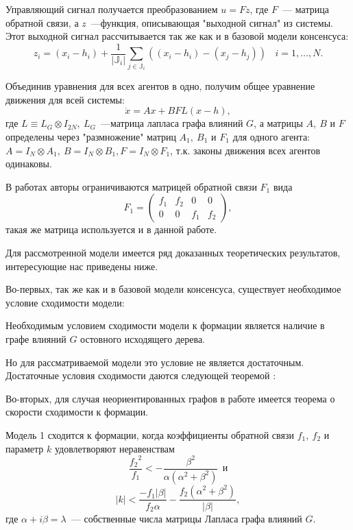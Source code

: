 Управляющий сигнал получается преобразованием $u=Fz$, где $F$~--- матрица обратной связи, а $z$~---функция, описывающая "выходной сигнал" из системы. Этот выходной сигнал рассчитывается так же как и в базовой модели консенсуса:
$$
z_i=(x_i-h_i)+\frac{1}{|\mathbb{J}_i|}\sum_{j\in\mathbb{J}_i}\left((x_i-h_i)-(x_j-h_j)\right)\ \ \ \ i=1,\ldots,N.
$$

Объединив уравнения для всех агентов в одно, получим общее уравнение движения для всей системы:
\begin{equation}
\dot{x}=Ax+BFL(x-h),
\label{eq:linear-motion}
\end{equation}
где $L\equiv L_G\otimes I_{2N},\ L_G$~---матрица лапласа графа влияний $G$, а матрицы $A,\ B$ и $F$ определены через "размножение" матриц $A_1,\ B_1$ и $F_1$ для одного агента: $A=I_N\otimes A_1,\ B=I_N\otimes B_1, F=I_N\otimes F_1$, т.к. законы движения всех агентов одинаковы.

В работах \cite{lafferriere2005decentralized, veerman2005flocks} авторы ограничиваются матрицей обратной связи $F_1$ вида 
$$F_1=\left( \begin{array}{cccc}
f_1 & f_2 & 0 & 0 \\
0 & 0 & f_1 & f_2 \end{array} \right),$$ такая же матрица используется и в данной работе.

Для рассмотренной модели имеется ряд доказанных теоретических результатов, интересующие нас приведены ниже. 

Во-первых, так же как и в базовой модели консенсуса, существует необходимое условие сходимости модели:
\begin{proposition}
Необходимым условием сходимости модели к формации является наличие в графе влияний $G$ остовного исходящего дерева.
\end{proposition}

Но для рассматриваемой модели это условие не является достаточным. Достаточные условия сходимости даются следующей теоремой \cite{veerman2005flocks,lafferriere2005decentralized}:

Во-вторых, для случая неориентированных графов в работе \cite{lafferriere2005decentralized} имеется теорема о скорости сходимости к формации.
\begin{theorem}
Модель 1 сходится к формации, когда коэффициенты обратной связи $f_1,\ f_2$ и параметр $k$ удовлетворяют неравенствам 
\begin{equation}
\frac{{f_2}^2}{f_1}< -\frac{\beta^2}{\alpha(\alpha^2+\beta^2)}\ \ \text{и}
\end{equation}
\begin{equation}
|k|<\frac{-f_1|\beta|}{f_2\alpha}-\frac{f_2(\alpha^2+\beta^2)}{|\beta|},
\end{equation}
где $\alpha+i\beta=\lambda$~--- собственные числа матрицы Лапласа графа влияний $G$.
\end{theorem}

